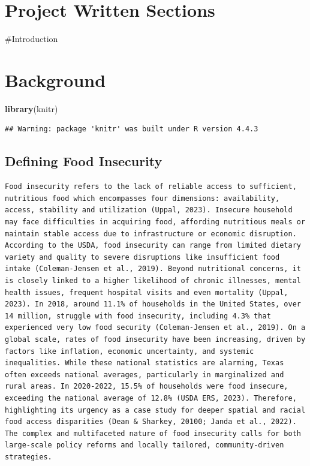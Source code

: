 \documentclass[
]{article}
\author{}
\date{\vspace{-2.5em}}
\newenvironment{Shaded}{\begin{snugshade}}{\end{snugshade}}
\newcommand{\FunctionTok}[1]{\textcolor[rgb]{0.13,0.29,0.53}{\textbf{#1}}}
\newcommand{\NormalTok}[1]{#1}
\begin{document}
\section{Project Written Sections}\label{project-written-sections}

\#Introduction

\section{Background}\label{background}

\begin{Shaded}
\begin{Highlighting}[]
\FunctionTok{library}\NormalTok{(knitr)}
\end{Highlighting}
\end{Shaded}

\begin{verbatim}
## Warning: package 'knitr' was built under R version 4.4.3
\end{verbatim}

\subsection{Defining Food Insecurity}\label{defining-food-insecurity}

\begin{verbatim}
Food insecurity refers to the lack of reliable access to sufficient, nutritious food which encompasses four dimensions: availability, access, stability and utilization (Uppal, 2023). Insecure household may face difficulties in acquiring food, affording nutritious meals or maintain stable access due to infrastructure or economic disruption. According to the USDA, food insecurity can range from limited dietary variety and quality to severe disruptions like insufficient food intake (Coleman-Jensen et al., 2019). Beyond nutritional concerns, it is closely linked to a higher likelihood of chronic illnesses, mental health issues, frequent hospital visits and even mortality (Uppal, 2023). In 2018, around 11.1% of households in the United States, over 14 million, struggle with food insecurity, including 4.3% that experienced very low food security (Coleman-Jensen et al., 2019). On a global scale, rates of food insecurity have been increasing, driven by factors like inflation, economic uncertainty, and systemic inequalities. While these national statistics are alarming, Texas often exceeds national averages, particularly in marginalized and rural areas. In 2020-2022, 15.5% of households were food insecure, exceeding the national average of 12.8% (USDA ERS, 2023). Therefore, highlighting its urgency as a case study for deeper spatial and racial food access disparities (Dean & Sharkey, 20100; Janda et al., 2022). The complex and multifaceted nature of food insecurity calls for both large-scale policy reforms and locally tailored, community-driven strategies.
\end{verbatim}
\end{document}
